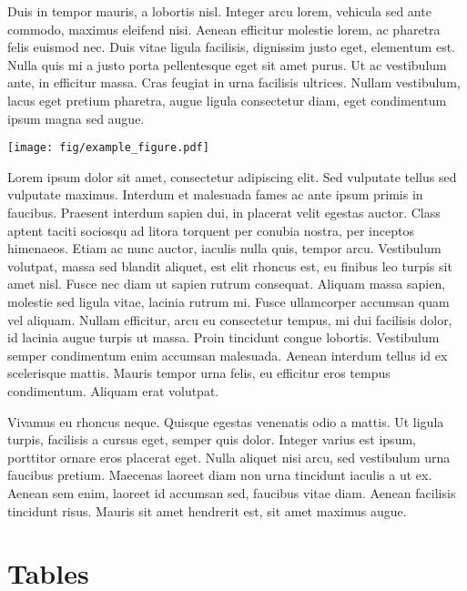 \documentclass[10pt]{article}
\begin{document}
Duis in tempor mauris, a lobortis nisl. Integer arcu lorem, vehicula sed
ante commodo, maximus eleifend nisi. Aenean efficitur molestie lorem, ac
pharetra felis euismod nec. Duis vitae ligula facilisis, dignissim justo
eget, elementum est. Nulla quis mi a justo porta pellentesque eget sit
amet purus. Ut ac vestibulum ante, in efficitur massa. Cras feugiat in
urna facilisis ultrices. Nullam vestibulum, lacus eget pretium pharetra,
augue ligula consectetur diam, eget condimentum ipsum magna sed augue.

\setlength{\intextsep}{2pt}\setlength{\columnsep}{8pt}\begin{figure*}[t]\centering\texttt{[image: fig/example\_figure.pdf]}\caption{\label{fig3}Fig.
\ref{fig3}: Example double-column figure}\vspace{-5pt}\end{figure*}

Lorem ipsum dolor sit amet, consectetur adipiscing elit. Sed vulputate
tellus sed vulputate maximus. Interdum et malesuada fames ac ante ipsum
primis in faucibus. Praesent interdum sapien dui, in placerat velit
egestas auctor. Class aptent taciti sociosqu ad litora torquent per
conubia nostra, per inceptos himenaeos. Etiam ac nunc auctor, iaculis
nulla quis, tempor arcu. Vestibulum volutpat, massa sed blandit aliquet,
est elit rhoncus est, eu finibus leo turpis sit amet nisl. Fusce nec
diam ut sapien rutrum consequat. Aliquam massa sapien, molestie sed
ligula vitae, lacinia rutrum mi. Fusce ullamcorper accumsan quam vel
aliquam. Nullam efficitur, arcu eu consectetur tempus, mi dui facilisis
dolor, id lacinia augue turpis ut massa. Proin tincidunt congue
lobortis. Vestibulum semper condimentum enim accumsan malesuada. Aenean
interdum tellus id ex scelerisque mattis. Mauris tempor urna felis, eu
efficitur eros tempus condimentum. Aliquam erat volutpat.

Vivamus eu rhoncus neque. Quisque egestas venenatis odio a mattis. Ut
ligula turpis, facilisis a cursus eget, semper quis dolor. Integer
varius est ipsum, porttitor ornare eros placerat eget. Nulla aliquet
nisi arcu, sed vestibulum urna faucibus pretium. Maecenas laoreet diam
non urna tincidunt iaculis a ut ex. Aenean sem enim, laoreet id accumsan
sed, faucibus vitae diam. Aenean facilisis tincidunt risus. Mauris sit
amet hendrerit est, sit amet maximus augue.

\hypertarget{tables}{%
\section{Tables}\label{tables}}
\end{document}
